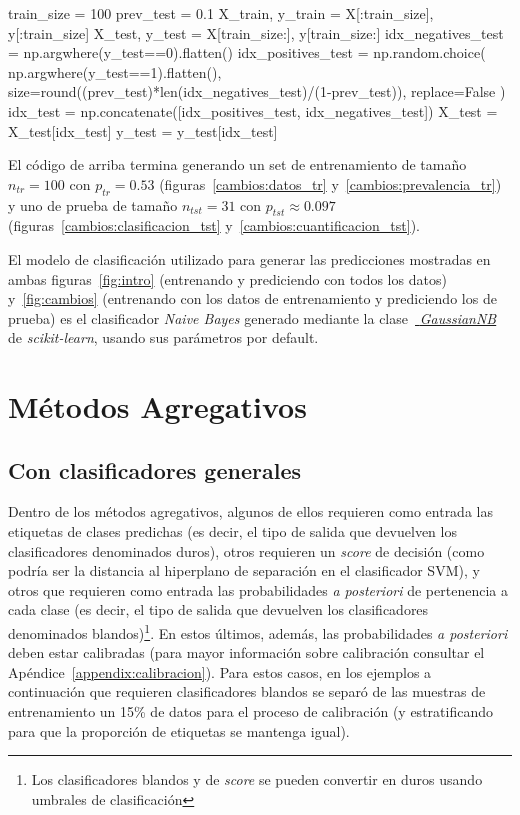 \begin{python}
train_size = 100 prev_test = 0.1 X_train, y_train = X[:train_size],
y[:train_size] X_test, y_test = X[train_size:], y[train_size:]
idx_negatives_test = np.argwhere(y_test==0).flatten() idx_positives_test =
np.random.choice( np.argwhere(y_test==1).flatten(),
size=round((prev_test)*len(idx_negatives_test)/(1-prev_test)), replace=False )
idx_test = np.concatenate([idx_positives_test, idx_negatives_test]) X_test =
X_test[idx_test] y_test = y_test[idx_test]
\end{python}

El código de arriba termina generando un set de entrenamiento de tamaño
\(n_{tr}=100\) con \(p_{tr}=0.53\) (figuras~\ref{cambios:datos_tr}
y~\ref{cambios:prevalencia_tr}) y uno de prueba de tamaño \(n_{tst}=31\) con
\(p_{tst}\approx0.097\) (figuras~\ref{cambios:clasificacion_tst}
y~\ref{cambios:cuantificacion_tst}).

El modelo de clasificación utilizado para generar las predicciones mostradas en
ambas figuras~\ref{fig:intro} (entrenando y prediciendo con todos los datos)
y~\ref{fig:cambios} (entrenando con los datos de entrenamiento y prediciendo los
de prueba) es el clasificador {\it Naive Bayes\/} generado mediante la
clase~\href{https://scikit-learn.org/stable/modules/generated/sklearn.naive_bayes.GaussianNB.html}{{\it
GaussianNB}} de {\it scikit-learn}, usando sus parámetros por default.

\section{Métodos Agregativos}\label{estimacion:agregativos}

\subsection{Con clasificadores generales}\label{estimacion:generales}

Dentro de los métodos agregativos, algunos de ellos requieren como entrada las
etiquetas de clases predichas (es decir, el tipo de salida que devuelven los
clasificadores denominados duros), otros requieren un {\it score\/} de decisión
(como podría ser la distancia al hiperplano de separación en el clasificador
SVM), y otros que requieren como entrada las probabilidades {\it a posteriori\/}
de pertenencia a cada clase (es decir, el tipo de salida que devuelven los
clasificadores denominados blandos)\footnote{Los clasificadores blandos y de
{\it score\/} se pueden convertir en duros usando umbrales de clasificación}. En
estos últimos, además, las probabilidades {\it a posteriori\/} deben estar
calibradas (para mayor información sobre calibración consultar el
Apéndice~\ref{appendix:calibracion}). Para estos casos, en los ejemplos a
continuación que requieren clasificadores blandos se separó de las muestras de
entrenamiento un 15\% de datos para el proceso de calibración (y estratificando
para que la proporción de etiquetas se mantenga igual).

